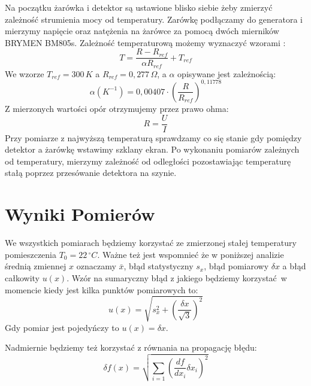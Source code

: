 \documentclass[12pt]{article}
\begin{document}
Na początku żarówka i detektor są ustawione blisko siebie żeby zmierzyć zależność strumienia mocy od temperatury.
Zarówkę podłączamy do generatora i mierzymy napięcie oraz natężenia na żarówce za pomocą dwóch mierników BRYMEN BM805s. Zależność temperaturową możemy wyznaczyć wzorami \cite{skrypt}:
\begin{equation}
    T = \frac{R - R_{ref}}{\alpha R_{ref}} + T_{ref}
    \label{eq:temp_bulb}
\end{equation}
We wzorze $T_{ref} = 300\,K$ a $R_{ref} = 0{,}277\, \Omega$, a $\alpha$ opisywane jest zależnością:
\[
    \alpha(K^{-1}) = 0{,}00407 \cdot (\frac{R}{R_{ref}})^{0{,}11778}
\]
Z mierzonych wartości opór otrzymujemy przez prawo ohma:
\[
    R = \frac{U}{I}
\]
Przy pomiarze z najwyższą temperaturą sprawdzamy co się stanie gdy pomiędzy detektor a żarówkę wstawimy szklany ekran.
Po wykonaniu pomiarów zależnych od temperatury, mierzymy zależność od odległości pozostawiając temperaturę stałą poprzez przesówanie detektora na szynie.
\section{Wyniki Pomierów}
We wszystkich pomiarach będziemy korzystać ze zmierzonej stałej temperatury pomieszczenia $T_0 = 22 \, ^{\circ}C$.
Ważne też jest wspomnieć że w poniższej analizie średnią zmiennej $x$ oznaczamy $\bar{x}$, błąd statystyczny $s_x$, błąd pomiarowy $\delta x$ a błąd całkowity $u(x)$.
Wzór na sumaryczny błąd z jakiego będziemy korzystać w momencie kiedy jest kilka punktów pomiarowych to:
\begin{equation}
    u(x) = \sqrt{s_x^2 + (\frac{\delta x}{\sqrt{3}})^2}
    \label{eq:combined_error}
\end{equation}
Gdy pomiar jest pojedyńczy to $u(x) = \delta x$.

Nadmiernie będziemy też korzystać z równania na propagację błędu:
\begin{equation}
    \delta f(x) = \sqrt{\sum_{i=1} (\frac{df}{dx_i} \delta x_i)^2}
    \label{eq:error_propagation}
\end{equation}
\end{document}
